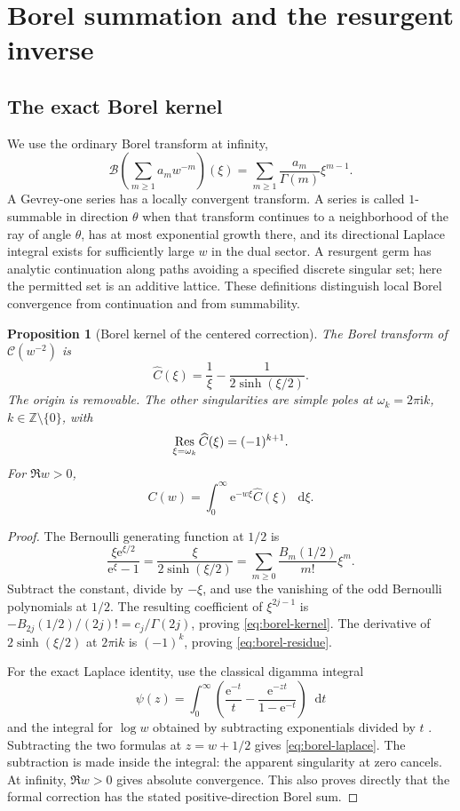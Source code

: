 \documentclass[11pt,a4paper]{article}
\newtheorem{proposition}[theorem]{Proposition}
\theoremstyle{definition}
\numberwithin{equation}{section}
\newcommand{\dd}{\mathop{}\!\mathrm{d}}
\newcommand{\ii}{\mathrm{i}}
\newcommand{\ee}{\mathrm{e}}
\newcommand{\Borel}{\mathcal B}
\newcommand{\cformal}{\mathscr C}
\begin{document}
\section{Borel summation and the resurgent inverse}
\label{sec:borel}

\subsection{The exact Borel kernel}
We use the ordinary Borel transform at infinity,
\[
 \Borel\left(\sum_{m\ge1}a_mw^{-m}\right)(\xi)
       =\sum_{m\ge1}\frac{a_m}{\Gamma(m)}\xi^{m-1}.
\]
A Gevrey-one series has a locally convergent transform. A series is called $1$-summable in direction $\theta$ when that transform continues to a neighborhood of the ray of angle $\theta$, has at most exponential growth there, and its directional Laplace integral exists for sufficiently large $w$ in the dual sector. A resurgent germ has analytic continuation along paths avoiding a specified discrete singular set; here the permitted set is an additive lattice. These definitions distinguish local Borel convergence from continuation and from summability.

\begin{proposition}[Borel kernel of the centered correction]
\label{prop:kernel}
The Borel transform of $\cformal(w^{-2})$ is
\begin{equation}
 \widehat C(\xi)=\frac1\xi-\frac1{2\sinh(\xi/2)}.
 \label{eq:borel-kernel}
\end{equation}
The origin is removable. The other singularities are simple poles at
$\omega_k=2\pi\ii k$, $k\in\mathbb Z\setminus\{0\}$, with
\begin{equation}
 \mathop{\rm Res}_{\xi=\omega_k}\widehat C(\xi)=(-1)^{k+1}.
 \label{eq:borel-residue}
\end{equation}
For $\Re w>0$,
\begin{equation}
 C(w)=\int_0^\infty\ee^{-w\xi}\widehat C(\xi)\,\dd\xi.
 \label{eq:borel-laplace}
\end{equation}
\end{proposition}
\begin{proof}
The Bernoulli generating function at $1/2$ is
\[
 \frac{\xi\ee^{\xi/2}}{\ee^\xi-1}
 =\frac\xi{2\sinh(\xi/2)}
 =\sum_{m\ge0}\frac{B_m(1/2)}{m!}\xi^m.
\]
Subtract the constant, divide by $-\xi$, and use the vanishing of the odd Bernoulli polynomials at $1/2$. The resulting coefficient of $\xi^{2j-1}$ is
$-B_{2j}(1/2)/(2j)!=c_j/\Gamma(2j)$, proving \eqref{eq:borel-kernel}. The derivative of $2\sinh(\xi/2)$ at $2\pi\ii k$ is $(-1)^k$, proving \eqref{eq:borel-residue}.

For the exact Laplace identity, use the classical digamma integral
\[
 \psi(z)=\int_0^\infty
 \left(\frac{\ee^{-t}}t-\frac{\ee^{-zt}}{1-\ee^{-t}}\right)\dd t
\]
and the integral for $\log w$ obtained by subtracting exponentials divided by $t$ \cite[\S5.9]{dlmf}. Subtracting the two formulas at $z=w+1/2$ gives \eqref{eq:borel-laplace}. The subtraction is made inside the integral: the apparent singularity at zero cancels. At infinity, $\Re w>0$ gives absolute convergence. This also proves directly that the formal correction has the stated positive-direction Borel sum.
\end{proof}
\end{document}
